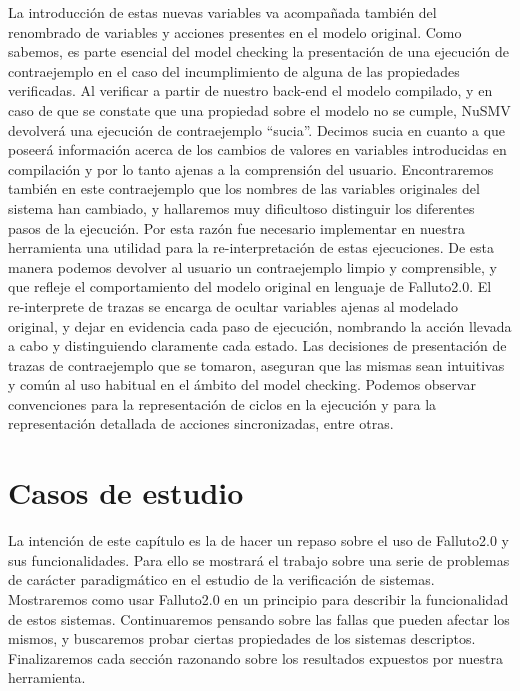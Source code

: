 \documentclass[pdftex,a4paper,12pt]{book}
\begin{document}
La introducci\'on de estas nuevas variables va acompa\~nada tambi\'en del renombrado de variables y acciones presentes en el modelo original. Como sabemos, es parte esencial del model checking la presentaci\'on de una ejecuci\'on de contraejemplo en el caso del incumplimiento de alguna de las propiedades verificadas. Al verificar a partir de nuestro back-end el modelo compilado, y en caso de que se constate que una propiedad sobre el modelo no se cumple, NuSMV devolver\'a una ejecuci\'on de contraejemplo ``sucia''. Decimos sucia en cuanto a que poseer\'a informaci\'on acerca de los cambios de valores en variables introducidas en compilaci\'on y por lo tanto ajenas a la comprensi\'on del usuario. Encontraremos tambi\'en en este contraejemplo que los nombres de las variables originales del sistema han cambiado, y hallaremos muy dificultoso distinguir los diferentes pasos de la ejecuci\'on. Por esta raz\'on fue necesario implementar en nuestra herramienta una utilidad para la re-interpretaci\'on de estas ejecuciones. De esta manera podemos devolver al usuario un contraejemplo limpio y comprensible, y que refleje el comportamiento del modelo original en lenguaje de Falluto2.0. El re-interprete de trazas se encarga de ocultar variables ajenas al modelado original, y dejar en evidencia cada paso de ejecuci\'on, nombrando la acci\'on llevada a cabo y distinguiendo claramente cada estado. Las decisiones de presentaci\'on de trazas de contraejemplo que se tomaron, aseguran que las mismas sean intuitivas y com\'un al uso habitual en el \'ambito del model checking. Podemos observar convenciones para la representaci\'on de ciclos en la ejecuci\'on y para la representaci\'on detallada de acciones sincronizadas, entre otras.


\chapter{Casos de estudio}
\label{CapCasosDeEstudio}

La intenci\'on de este cap\'itulo es la de hacer un repaso sobre el uso de Falluto2.0 y sus funcionalidades. Para ello se mostrar\'a el trabajo sobre una serie de problemas de car\'acter paradigm\'atico en el estudio de la verificaci\'on de sistemas. Mostraremos como usar Falluto2.0 en un principio para describir la funcionalidad de estos sistemas. Continuaremos pensando sobre las fallas que pueden afectar los mismos, y buscaremos probar ciertas propiedades de los sistemas descriptos. Finalizaremos cada secci\'on razonando sobre los resultados expuestos por nuestra herramienta.
\end{document}
